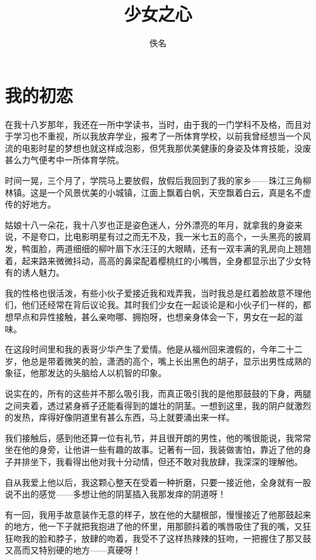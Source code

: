 \documentclass[12pt,UTF8]{ctexbook}
\title{\heiti\zihao{0} 少女之心}
\author{佚名}
\date{}
\begin{document}
\maketitle
\tableofcontents

\frontmatter

\mainmatter

\chapter{我的初恋}

在我十八岁那年，我还在一所中学读书，当时，由于我的一门学科不及格，而且对于学习也不重视，所以我放弃学业，报考了一所体育学校，以前我曾经想当一个风流的电影时星的梦想也就这样成泡影，但凭我那优美健康的身姿及体育技能，没废甚么力气便考中一所体育学院。

时间一晃，三个月了，学院马上要放假，放假后我回到了我的家乡——珠江三角柳林镇。这是一个风景优美的小城镇，江面上飘着白帆，天空飘着白云，真是名不虚传的好地方。

姑娘十八一朵花，我十八岁也正是姿色迷人，分外漂亮的年月，就拿我的身姿来说，不是夸口，比电影明星有过之而无不及，我一米七五的高个，一头黑亮的披肩发，鸭蛋脸，两道细细的柳叶眉下水汪汪的大眼睛，还有一双丰满的乳房向上翘翘着，起来路来微微抖动，高高的鼻梁配着樱桃红的小嘴唇，全身都显示出了少女特有的诱人魅力。

我的性格也很活泼，有些小伙子爱接近我和戏弄我，当时我总是红着脸故意不理他们，他们还经常在背后议论我。其时我们少女在一起谈论是和小伙子们一样的，都想早点和异性接触，甚么亲吻哪、拥抱呀，也想亲身体会一下，男女在一起的滋味。

在这段时间里和我的表哥少华产生了爱情。他是从福州回来渡假的，今年二十二岁，他总是带着微笑的脸，潇洒的高个，嘴上长出黑色的胡子，显示出男性成熟的象征，他那发达的头脑给人以机智的印象。

说实在的，所有的这些并不那么吸引我，而真正吸引我的是他那鼓鼓的下身，两腿之间夹着，透过紧身裤子还能看得到的雄壮的阴茎。一想到这里，我的阴户就激烈的发热，痒得好像阴道里有甚么东西，马上就要涌出来一样。

我们接触后，感到他还算一位有礼节，并且很开朗的男性，他的嘴很能说，我常常坐在他的身旁，让他讲一些有趣的故事。记著有一回，我装做害怕，靠近了他的身子并排坐下，我看得出他对我十分动情，但还不敢对我放肆，我深深的理解他。

自从我爱上他以后，我这颗心整天在受着一种折磨，只要一接近他，全身就有一股说不出的感觉——多想让他的阴茎插入我那发痒的阴道呀！

有一回，我用手故意装作无意的样子，放在他的大腿根部，慢慢接近了他那鼓起来的地方，他一下子就把我抱进了他的怀里，用那颤抖着的嘴唇吸住了我的嘴，又狂狂吻我的脸和脖子，放肆的吻着，我受不了这样热辣辣的狂吻，一把握住了那又鼓又高而又特别硬的地方——真硬呀！
\end{document}
